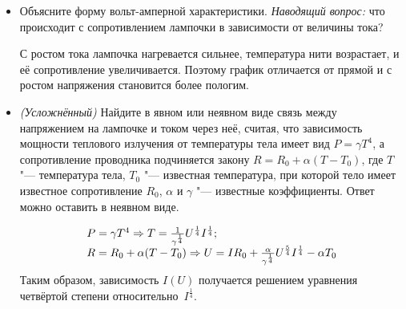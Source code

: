 \begin{itemize}
    \item Объясните форму вольт-амперной характеристики. {\itshape Наводящий вопрос:} что происходит с сопротивлением лампочки в зависимости от величины тока?\par
    \Answer С ростом тока лампочка нагревается сильнее, температура нити возрастает, и её сопротивление увеличивается. Поэтому график отличается от прямой и с ростом напряжения становится более пологим.
    \item {\itshape(Усложнённый)} Найдите в явном или неявном виде связь между напряжением на лампочке и током через неё, считая, что зависимость мощности теплового излучения от температуры тела имеет вид \(P = \gamma T^4\), а сопротивление проводника подчиняется закону \(R = R_0 + \alpha (T-T_0)\), где \(T\) "--- температура тела, \(T_0\) "--- известная температура, при которой тело имеет известное сопротивление \(R_0\), \(\alpha\) и \(\gamma\) "--- известные коэффициенты. Ответ можно оставить в неявном виде.\par
    \Answer \begin{equation*}
    	\begin{array}{@{}l@{}}
    		P = \gamma T^4 \Rightarrow T=\frac{1}{\gamma^\frac{1}{4}} U^\frac{1}{4} I^\frac{1}{4};\\
    		R = R_0 + \alpha(T-T_0) \Rightarrow U=IR_0+\frac{\alpha}{\gamma^\frac{1}{4}} U^\frac{5}{4} I^\frac{1}{4}-\alpha T_0
    	\end{array}
    \end {equation*}
    Таким образом, зависимость \(I(U)\) получается решением уравнения четвёртой степени относительно~\(I^\frac{1}{4}\).    
\end{itemize}
